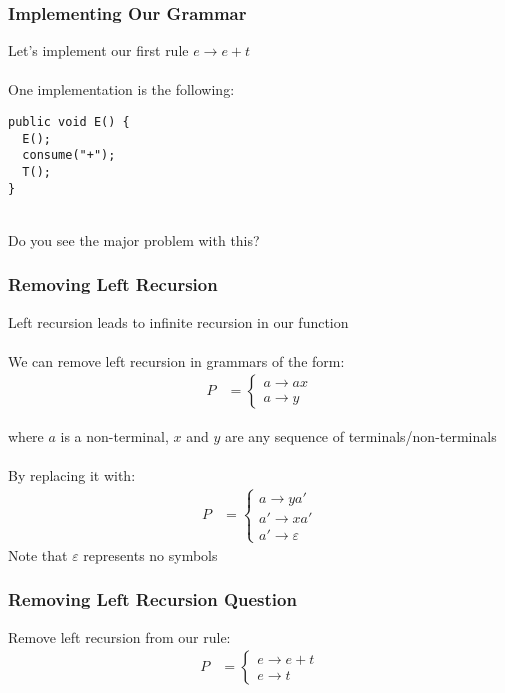 \documentclass[aspectratio=169]{beamer}
\begin{document}
\begin{frame}[fragile]
\frametitle{Implementing Our Grammar}

Let's implement our first rule $e \rightarrow e + t$\\~\\

One implementation is the following:

\begin{lstlisting}[backgroundcolor=\color{solarizedRebase02}]
public void E() {
  E();
  consume("+");
  T();
}
\end{lstlisting}
~\\
Do you see the major problem with this?
\end{frame}

\begin{frame}
\frametitle{Removing Left Recursion}

Left recursion leads to infinite recursion in our function\\~\\

We can remove left recursion in grammars of the form:
\begin{align*}
P &= \begin{cases}a \rightarrow a x\\
  a \rightarrow y\end{cases}
\end{align*}

where $a$ is a non-terminal, $x$ and $y$ are any sequence of
terminals/non-terminals\\~\\

By replacing it with:
\begin{align*}
P &= \begin{cases}a \rightarrow y a'\\
  a' \rightarrow x a'\\
  a' \rightarrow \varepsilon \text{} \end{cases}
\end{align*}
Note that $\varepsilon$ represents no symbols
\end{frame}

\begin{frame}
\frametitle{Removing Left Recursion Question}

Remove left recursion from our rule:
\begin{align*}
P &= \begin{cases}e \rightarrow e + t\\
  e \rightarrow t\end{cases}
\end{align*}
\end{frame}
\end{document}
